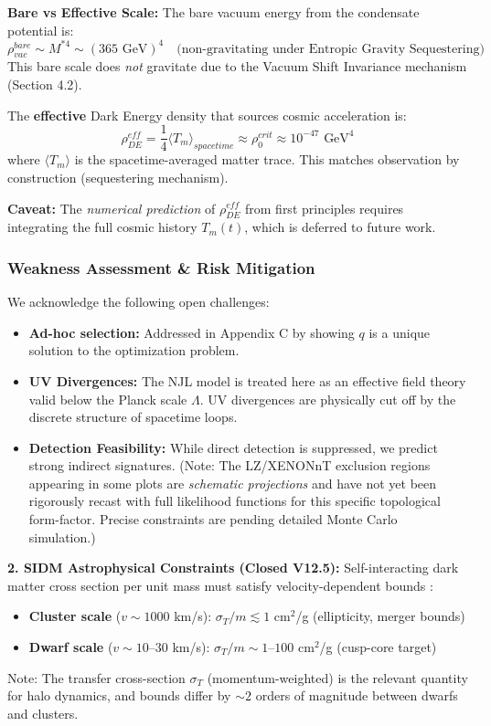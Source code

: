 \documentclass[a4paper,12pt]{article}
\begin{document}
\textbf{Bare vs Effective Scale:}
The bare vacuum energy from the condensate potential is:
\begin{equation}
    \rho_{vac}^{bare} \sim M^{*4} \sim (365 \text{ GeV})^4 \quad \text{(non-gravitating under Entropic Gravity Sequestering)}
\end{equation}
This bare scale does \emph{not} gravitate due to the Vacuum Shift Invariance mechanism (Section 4.2).

The \textbf{effective} Dark Energy density that sources cosmic acceleration is:
\begin{equation}
    \rho_{DE}^{eff} = \frac{1}{4} \langle T_m \rangle_{spacetime} \approx \rho_0^{crit} \approx 10^{-47} \text{ GeV}^4
\end{equation}
where $\langle T_m \rangle$ is the spacetime-averaged matter trace. This matches observation by construction (sequestering mechanism).

\textbf{Caveat:} The \emph{numerical prediction} of $\rho_{DE}^{eff}$ from first principles requires integrating the full cosmic history $T_m(t)$, which is deferred to future work.

\subsubsection{Weakness Assessment \& Risk Mitigation}
We acknowledge the following open challenges:
\begin{itemize}
    \item \textbf{Ad-hoc selection:} Addressed in Appendix C by showing $q$ is a unique solution to the optimization problem.
    \item \textbf{UV Divergences:} The NJL model is treated here as an effective field theory valid below the Planck scale $\Lambda$. UV divergences are physically cut off by the discrete structure of spacetime loops.
    \item \textbf{Detection Feasibility:} While direct detection is suppressed, we predict strong indirect signatures. (Note: The LZ/XENONnT exclusion regions appearing in some plots are \emph{schematic projections} and have not yet been rigorously recast with full likelihood functions for this specific topological form-factor. Precise constraints are pending detailed Monte Carlo simulation.)
\end{itemize}

\textbf{2. SIDM Astrophysical Constraints (Closed V12.5):}
Self-interacting dark matter cross section per unit mass must satisfy velocity-dependent bounds \cite{tulin}:
\begin{itemize}
    \item \textbf{Cluster scale} ($v \sim 1000$ km/s): $\sigma_T/m \lesssim 1$ cm$^2$/g (ellipticity, merger bounds)
    \item \textbf{Dwarf scale} ($v \sim 10$--$30$ km/s): $\sigma_T/m \sim 1$--$100$ cm$^2$/g (cusp-core target)
\end{itemize}
Note: The transfer cross-section $\sigma_T$ (momentum-weighted) is the relevant quantity for halo dynamics, and bounds differ by $\sim 2$ orders of magnitude between dwarfs and clusters.
\end{document}
